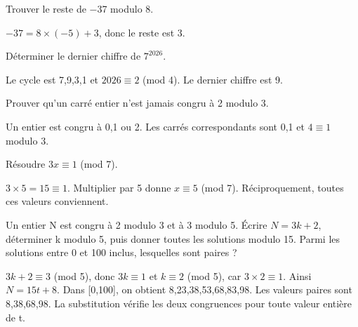 \documentclass[11pt]{article}
\begin{document}
Trouver le reste de −37 modulo 8.\par
−\(37 = 8 \times  (-5) + 3\), donc le reste est 3.\par
{}
Déterminer le dernier chiffre de \(7^{2026}\).\par
Le cycle est 7,9,3,1 et \(2026 \equiv  2\) (mod 4). Le dernier chiffre est 9.\par
{}
Prouver qu’un carré entier n’est jamais congru à 2 modulo 3.\par
Un entier est congru à 0,1 ou 2. Les carrés correspondants sont 0,1 et \(4 \equiv  1\) modulo 3.\par
{}
Résoudre \(3x \equiv  1\) (mod 7).\par
\(3 \times  5 = 15 \equiv  1\). Multiplier par 5 donne \(x \equiv  5\) (mod 7). Réciproquement, toutes ces valeurs conviennent.\par
{}
Un entier N est congru à 2 modulo 3 et à 3 modulo 5. Écrire \(N = 3k + 2\), déterminer k modulo 5, puis donner toutes les solutions modulo 15. Parmi les solutions entre 0 et 100 inclus, lesquelles sont paires ?\par
\(3k + 2 \equiv  3\) (mod 5), donc \(3k \equiv  1\) et \(k \equiv  2\) (mod 5), car \(3 \times  2 \equiv  1\). Ainsi \(N = 15t + 8\). Dans [0,100], on obtient 8,23,38,53,68,83,98. Les valeurs paires sont 8,38,68,98. La substitution vérifie les deux congruences pour toute valeur entière de t.\par
\end{document}
